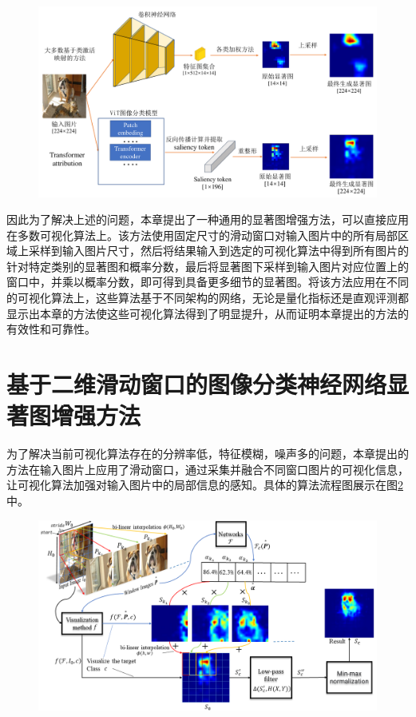 \begin{figure}[h]
	\centering 
	\includegraphics[width=15cm]{fig/ch4/motivation.pdf}
	\label{fig:motivation}
\end{figure}


因此为了解决上述的问题，本章提出了一种通用的显著图增强方法，可以直接应用在多数可视化算法上。该方法使用固定尺寸的滑动窗口对输入图片中的所有局部区域上采样到输入图片尺寸，然后将结果输入到选定的可视化算法中得到所有图片的针对特定类别的显著图和概率分数，最后将显著图下采样到输入图片对应位置上的窗口中，并乘以概率分数，即可得到具备更多细节的显著图。将该方法应用在不同的可视化算法上，这些算法基于不同架构的网络，无论是量化指标还是直观评测都显示出本章的方法使这些可视化算法得到了明显提升，从而证明本章提出的方法的有效性和可靠性。


\section{基于二维滑动窗口的图像分类神经网络显著图增强方法}
为了解决当前可视化算法存在的分辨率低，特征模糊，噪声多的问题，本章提出的方法在输入图片上应用了滑动窗口，通过采集并融合不同窗口图片的可视化信息，让可视化算法加强对输入图片中的局部信息的感知。具体的算法流程图展示在图\ref{fig:pipeline}中。

\begin{figure}[h]
	\centering 
	\includegraphics[width=15cm]{fig/ch4/pipeline.png}
	\label{fig:pipeline}
\end{figure}

